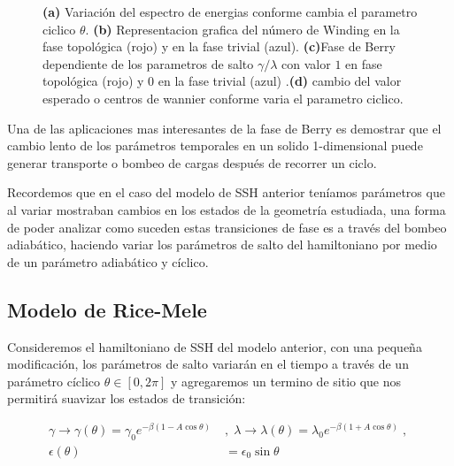 \begin{figure}[h!]
\begin{subfigure}[b!]{0.27 \textwidth}
     \end{subfigure}
     \caption{\textbf{(a)} Variación del espectro de energias conforme cambia el parametro ciclico $\theta$. \textbf{(b)} Representacion grafica del número de Winding en la fase topológica (rojo) y en la fase trivial (azul). \textbf{(c)}Fase de Berry dependiente de los parametros de salto $\gamma/\lambda$ con valor $1$ en fase topológica (rojo) y $0$ en la fase trivial (azul) .\textbf{(d)} cambio del valor esperado o centros de wannier conforme varia el parametro ciclico.}
    \label{fig:Pump_example_Results}
\end{figure}

Una de las aplicaciones mas interesantes de la fase de Berry es demostrar que el cambio lento de los parámetros temporales en un solido 1-dimensional puede generar transporte o bombeo de cargas después de recorrer un ciclo.

Recordemos que en el caso del modelo de SSH anterior teníamos parámetros que al variar mostraban cambios en los estados de la geometría estudiada, una forma de poder analizar como suceden estas transiciones de fase es a través del bombeo adiabático, haciendo variar los parámetros de salto del hamiltoniano por medio de un parámetro adiabático y cíclico.

\subsection{Modelo de Rice-Mele}

Consideremos el hamiltoniano de SSH del modelo anterior, con una pequeña modificación, los parámetros de salto variarán en el tiempo a través de un parámetro cíclico $\theta \in \left[ 0 , 2\pi\right]$ y agregaremos un termino de sitio que nos permitirá suavizar los estados de transición:


\begin{align}
    \nonumber\gamma \rightarrow \gamma (\theta) = \gamma_0 e^{\displaystyle-\beta(1 - A \cos \theta )} \; &,\;  \lambda \rightarrow \lambda(\theta) = \lambda_0 e^{\displaystyle-\beta( 1 + A \cos \theta )} \;,\; \\  \epsilon(\theta) &= \epsilon_0 \sin \theta
\end{align}

